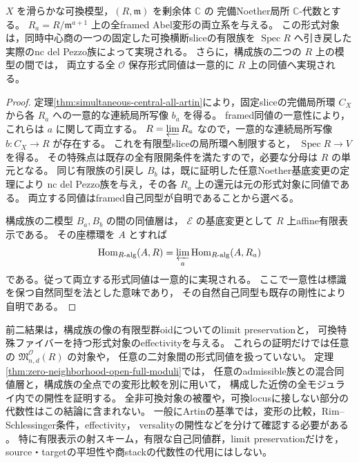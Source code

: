 \begin{proposition}[可換特殊ファイバーを持つ形式対象の実現]
\label{prop:commutative-formal-family-effective}
$X$ を滑らかな可換模型，$(R,\mathfrak m)$ を剰余体 $\mathbb C$ の
完備Noether局所 $\mathbb C$-代数とする。
$R_a=R/\mathfrak m^{a+1}$ 上の全framed Abel変形の両立系を与える。
この形式対象は，同時中心商の一つの固定した可換横断sliceの有限族を
$\operatorname{Spec}R$ へ引き戻した実際のnc del Pezzo族によって実現される。
さらに，構成族の二つの $R$ 上の模型の間では，
両立する全 $\mathcal O$ 保存形式同値は一意的に $R$ 上の同値へ実現される。
\end{proposition}
\begin{proof}
定理\ref{thm:simultaneous-central-all-artin}により，固定sliceの完備局所環
$C_X$ から各 $R_a$ への一意的な連続局所写像 $b_a$ を得る。
framed同値の一意性により，これらは $a$ に関して両立する。
$R=\varprojlim R_a$ なので，一意的な連続局所写像
$b:C_X\to R$ が存在する。
これを有限型sliceの局所環へ制限すると，
$\operatorname{Spec}R\to V$ を得る。
その特殊点は既存の全有限開条件を満たすので，必要な分母は $R$ の単元となる。
同じ有限族の引戻し $B_b$ は，既に証明した任意Noether基底変更の定理により
nc del Pezzo族を与え，その各 $R_a$ 上の還元は元の形式対象に同値である。
両立する同値はframed自己同型が自明であることから選べる。

構成族の二模型 $B_a,B_b$ の間の同値層は，
$\mathcal E$ の基底変更として $R$ 上affine有限表示である。
その座標環を $A$ とすれば
\[
 \operatorname{Hom}_{R\text{-alg}}(A,R)
    =\varprojlim_a\operatorname{Hom}_{R\text{-alg}}(A,R_a)
\]
である。従って両立する形式同値は一意的に実現される。
ここで一意性は標識を保つ自然同型を法とした意味であり，
その自然自己同型も既存の剛性により自明である。
\end{proof}

\begin{remark}[形式対象のeffectivityと全モジュライの比較]
前二結果は，構成族の像の有限型群oidについてのlimit preservationと，
可換特殊ファイバーを持つ形式対象のeffectivityを与える。
これらの証明だけでは任意の $\mathfrak M^{\mathcal O}_{n,d}(R)$ の対象や，
任意の二対象間の形式同値を扱っていない。
定理\ref{thm:zero-neighborhood-open-full-moduli}では，
任意のadmissible族との混合同値層と，構成族の全点での変形比較を別に用いて，
構成した近傍の全モジュライ内での開性を証明する。
全非可換対象の被覆や，可換locusに接しない部分の代数性はこの結論に含まれない。
一般にArtinの基準では，変形の比較，Rim--Schlessinger条件，effectivity，
versalityの開性などを分けて確認する必要がある
\cite[Tags 07T0, 07XP]{StacksProject}。
特に有限表示の射スキーム，有限な自己同値群，limit preservationだけを，
source・targetの平坦性や商stackの代数性の代用にはしない。
\end{remark}

